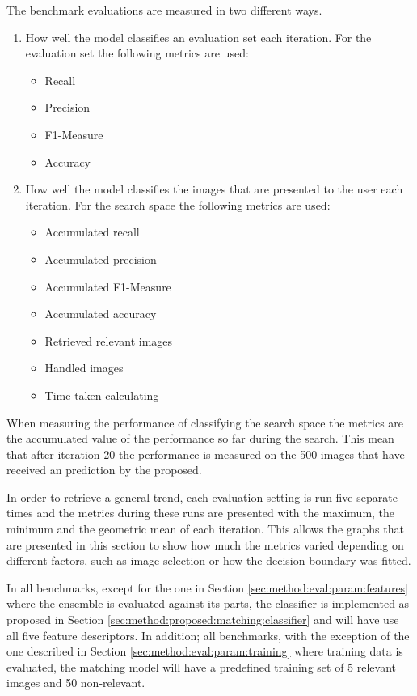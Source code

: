 The benchmark evaluations are measured in two different ways.
\begin{enumerate}
\item How well the model classifies an evaluation set each iteration. For the evaluation set the following metrics are used: 
	\begin{itemize}
		\item Recall
		\item Precision
		\item F1-Measure
		\item Accuracy
	\end{itemize}   
\item How well the model classifies the images that are presented to the user each iteration. For the search space the following metrics are used:
	\begin{itemize}
		\item Accumulated recall 
		\item Accumulated precision
		\item Accumulated F1-Measure
		\item Accumulated accuracy
		\item Retrieved relevant images
		\item Handled images
		\item Time taken calculating
	\end{itemize}   
\end{enumerate}
\medskip
When measuring the performance of classifying the search space the metrics are the accumulated value of the performance so far during the search. This mean that after iteration 20 the performance is measured on the 500 images that have received an prediction by the proposed.

In order to retrieve a general trend, each evaluation setting is run five separate times and the metrics during these runs are presented with the maximum, the minimum and the geometric mean of each iteration. This allows the graphs that are presented in this section to show how much the metrics varied depending on different factors, such as image selection or how the decision boundary was fitted.

In all benchmarks, except for the one in Section \ref{sec:method:eval:param:features} where the ensemble is evaluated against its parts, the classifier is implemented as proposed in Section \ref{sec:method:proposed:matching:classifier} and will have use all five feature descriptors. In addition; all benchmarks, with the exception of the one described in Section \ref{sec:method:eval:param:training} where training data is evaluated, the matching model will have a predefined training set of 5 relevant images and 50 non-relevant.

